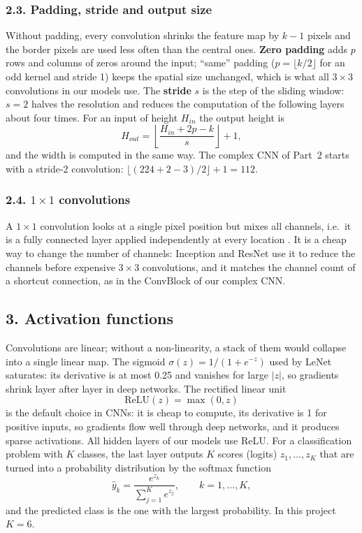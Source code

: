 \documentclass[12pt,letterpaper]{article}
\begin{document}
\subsubsection{2.3. Padding, stride and output size}
Without padding, every convolution shrinks the feature map by $k-1$ pixels and the border pixels are used less often
than the central ones. \textbf{Zero padding} adds $p$ rows and columns of zeros around the input; ``same'' padding
($p=\lfloor k/2\rfloor$ for an odd kernel and stride 1) keeps the spatial size unchanged, which is what all
$3\times3$ convolutions in our models use. The \textbf{stride} $s$ is the step of the sliding window: $s=2$ halves
the resolution and reduces the computation of the following layers about four times. For an input of height
$H_{in}$ the output height is
\begin{equation}
  H_{out} = \left\lfloor \frac{H_{in}+2p-k}{s} \right\rfloor + 1 ,
  \label{eq:size}
\end{equation}
and the width is computed in the same way. The complex CNN of Part~2 starts with a stride-2 convolution:
$\lfloor(224+2-3)/2\rfloor+1=112$.

\subsubsection{2.4. $1\times1$ convolutions}
A $1\times1$ convolution looks at a single pixel position but mixes all channels, i.e.\ it is a fully connected
layer applied independently at every location \cite{lin2014}. It is a cheap way to change the number of channels:
Inception and ResNet use it to reduce the channels before expensive $3\times3$ convolutions, and it matches the
channel count of a shortcut connection, as in the ConvBlock of our complex CNN.

\subsection{3. Activation functions}
Convolutions are linear; without a non-linearity, a stack of them would collapse into a single linear map. The
sigmoid $\sigma(z)=1/(1+e^{-z})$ used by LeNet saturates: its derivative is at most 0.25 and vanishes for large
$|z|$, so gradients shrink layer after layer in deep networks. The rectified linear unit
\cite{nair2010,krizhevsky2012}
\begin{equation}
  \mathrm{ReLU}(z)=\max(0,z)
  \label{eq:relu}
\end{equation}
is the default choice in CNNs: it is cheap to compute, its derivative is 1 for positive inputs, so gradients flow
well through deep networks, and it produces sparse activations. All hidden layers of our models use ReLU. For a
classification problem with $K$ classes, the last layer outputs $K$ scores (logits) $z_1,\dots,z_K$ that are turned
into a probability distribution by the softmax function
\begin{equation}
  \hat y_k = \frac{e^{z_k}}{\sum_{j=1}^{K} e^{z_j}}, \qquad k=1,\dots,K,
  \label{eq:softmax}
\end{equation}
and the predicted class is the one with the largest probability. In this project $K=6$.
\end{document}
